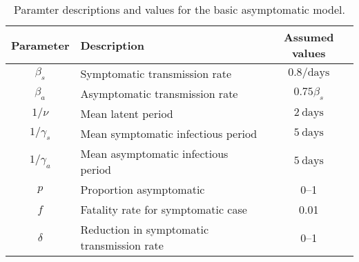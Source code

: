 \documentclass[12pt]{article}
\begin{document}
\begin{table}[h!]
  \begin{center}
    \begin{tabular}{c|l|c} %
      \textbf{Parameter} & \textbf{Description} & \textbf{Assumed values}\\
      \hline
      $\beta_s$ & Symptomatic transmission rate & $0.8/\mathrm{days}$\\
      \hline
      $\beta_a$ & Asymptomatic transmission rate & $0.75 \beta_s$ \\
      \hline
      $1/\nu$ & Mean latent period & $2\ \mathrm{days}$\\
      \hline
      $1/\gamma_s$ & Mean symptomatic infectious period & $5\ \mathrm{days}$\\
      \hline
      $1/\gamma_a$ & Mean asymptomatic infectious period & $5\ \mathrm{days}$\\
      \hline
      $p$ & Proportion asymptomatic & 0--1\\
      \hline
      $f$ & Fatality rate for symptomatic case & 0.01\\
      \hline
      $\delta$ & Reduction in symptomatic transmission rate & 0--1\\
    \end{tabular}
    \caption{Paramter descriptions and values for the basic asymptomatic model.}
    \label{tab:table1}
  \end{center}
\end{table}

\pagebreak
\end{document}
